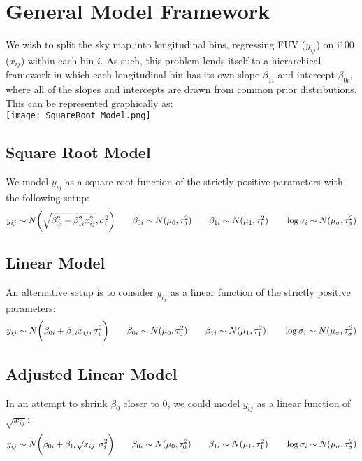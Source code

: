 \documentclass[12pt]{article}
\begin{document}

\def\ci{\perp\!\!\!\perp}
\def\ex{\mathbb{E}}
\def\prob{\mathbb{P}}
\def\ind{\mathbb{I}}
\def\grad{\triangledown}
\def\bigo{\mathcal{O}}

\section{General Model Framework}
We wish to split the sky map into longitudinal bins, regressing FUV ($y_{ij}$) on i100 ($x_{ij}$) within each bin $i$. As such, this problem lends itself to a hierarchical framework in which each longitudinal bin has its own slope $\beta_{1i}$ and intercept $\beta_{0i}$, where all of the slopes and intercepts are drawn from common prior distributions. This can be represented graphically as:\\

\indent\indent\indent\indent\indent\indent\indent\indent \texttt{[image: SquareRoot\_Model.png]}

\subsection{Square Root Model}
We model $y_{ij}$ as a square root function of the strictly positive parameters with the following setup:
$$y_{ij} \sim N \biggl( \sqrt{ \beta_{0i}^2 + \beta_{1i}^2 x_{ij}^2} , \sigma_i^2 \biggr)
\hspace{20 pt} \beta_{0i} \sim N(\mu_0,\tau_0^2)
\hspace{20 pt} \beta_{1i} \sim N(\mu_1,\tau_1^2)
\hspace{20 pt} \log\sigma_i \sim N(\mu_\sigma,\tau_\sigma^2)$$

\subsection{Linear Model}
An alternative setup is to consider $y_{ij}$ as a linear function of the strictly positive parameters:
$$y_{ij} \sim N \biggl( \beta_{0i} + \beta_{1i} x_{ij} , \sigma_i^2 \biggr)
\hspace{20 pt} \beta_{0i} \sim N(\mu_0,\tau_0^2)
\hspace{20 pt} \beta_{1i} \sim N(\mu_1,\tau_1^2)
\hspace{20 pt} \log\sigma_i \sim N(\mu_\sigma,\tau_\sigma^2)$$

\subsection{Adjusted Linear Model}
In an attempt to shrink $\beta_0$ closer to 0, we could model $y_{ij}$ as a linear function of $\sqrt{x_{ij}}$:
$$y_{ij} \sim N \biggl( \beta_{0i} + \beta_{1i} \sqrt{x_{ij}} , \sigma_i^2 \biggr)
\hspace{20 pt} \beta_{0i} \sim N(\mu_0,\tau_0^2)
\hspace{20 pt} \beta_{1i} \sim N(\mu_1,\tau_1^2)
\hspace{20 pt} \log\sigma_i \sim N(\mu_\sigma,\tau_\sigma^2)$$
\end{document}
